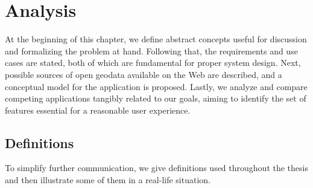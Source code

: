\chapter{Analysis}\label{chap:analysis}

At the beginning of this chapter, we define abstract concepts useful for discussion and formalizing the problem at hand. Following that, the requirements and use cases are stated, both of which are fundamental for proper system design. Next, possible sources of open geodata available on the Web are described, and a conceptual model for the application is proposed. Lastly, we analyze and compare competing applications tangibly related to our goals, aiming to identify the set of features essential for a reasonable user experience.

\section{Definitions}\label{sec:definitions}

To simplify further communication, we give definitions used throughout the thesis and then illustrate some of them in a real-life situation.

